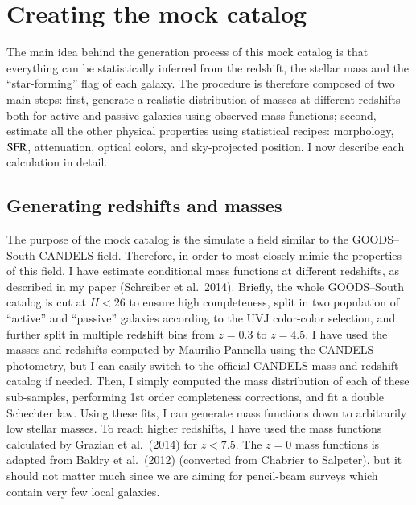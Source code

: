 \documentclass[12pt,a4paper]{article}
\newcommand{\sfr}{{\rm SFR}}
\begin{document}

\section{Creating the mock catalog}

The main idea behind the generation process of this mock catalog is that everything can be statistically inferred from the redshift, the stellar mass and the ``star-forming'' flag of each galaxy. The procedure is therefore composed of two main steps: first, generate a realistic distribution of masses at different redshifts both for active and passive galaxies using observed mass-functions; second, estimate all the other physical properties using statistical recipes: morphology, $\sfr$, attenuation, optical colors, and sky-projected position. I now describe each calculation in detail.


\subsection{Generating redshifts and masses}

The purpose of the mock catalog is the simulate a field similar to the GOODS--South CANDELS field. Therefore, in order to most closely mimic the properties of this field, I have estimate conditional mass functions at different redshifts, as described in my paper (Schreiber et al.~2014). Briefly, the whole GOODS--South catalog is cut at $H<26$ to ensure high completeness, split in two population of ``active'' and ``passive'' galaxies according to the UVJ color-color selection, and further split in multiple redshift bins from $z=0.3$ to $z=4.5$. I have used the masses and redshifts computed by Maurilio Pannella using the CANDELS photometry, but I can easily switch to the official CANDELS mass and redshift catalog if needed. Then, I simply computed the mass distribution of each of these sub-samples, performing 1st order completeness corrections, and fit a double Schechter law. Using these fits, I can generate mass functions down to arbitrarily low stellar masses. To reach higher redshifts, I have used the mass functions calculated by Grazian et al.~(2014) for $z < 7.5$. The $z=0$ mass functions is adapted from Baldry et al.~(2012) (converted from Chabrier to Salpeter), but it should not matter much since we are aiming for pencil-beam surveys which contain very few local galaxies.
\end{document}
